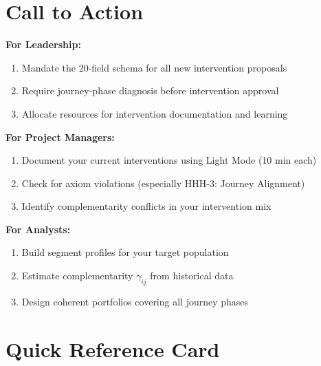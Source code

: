 \documentclass[11pt,a4paper]{article}
\begin{document}
\section*{Call to Action}

\begin{tcolorbox}[colback=accentgreen!10, colframe=accentgreen, title=\textbf{Immediate Next Steps}]

\textbf{For Leadership:}
\begin{enumerate}[nosep]
\item Mandate the 20-field schema for all new intervention proposals
\item Require journey-phase diagnosis before intervention approval
\item Allocate resources for intervention documentation and learning
\end{enumerate}

\textbf{For Project Managers:}
\begin{enumerate}[nosep]
\item Document your current interventions using Light Mode (10 min each)
\item Check for axiom violations (especially HHH-3: Journey Alignment)
\item Identify complementarity conflicts in your intervention mix
\end{enumerate}

\textbf{For Analysts:}
\begin{enumerate}[nosep]
\item Build segment profiles for your target population
\item Estimate complementarity $\gamma_{ij}$ from historical data
\item Design coherent portfolios covering all journey phases
\end{enumerate}

\end{tcolorbox}

\newpage
\section*{Quick Reference Card}
\end{document}
